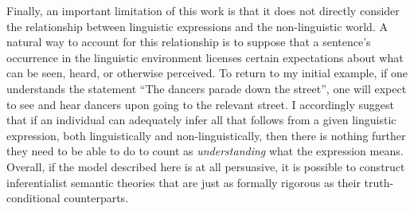 Finally, an important limitation of this work is that it does not directly consider the relationship between linguistic expressions and the non-linguistic world. A natural way to account for this relationship is to suppose that a sentence's occurrence in the linguistic environment licenses certain expectations about what can be seen, heard, or otherwise perceived. To return to my initial example, if one understands the statement ``The dancers parade down the street'', one will expect to see and hear dancers upon going to the relevant street. I accordingly suggest that if an individual can adequately infer all that follows from a given linguistic expression, both linguistically and non-linguistically, then there is nothing further they need to be able to do to count as \textit{understanding} what the expression means. Overall, if the model described here is at all persuasive, it is possible to construct inferentialist semantic theories that are just as formally rigorous as their truth-conditional counterparts. 

